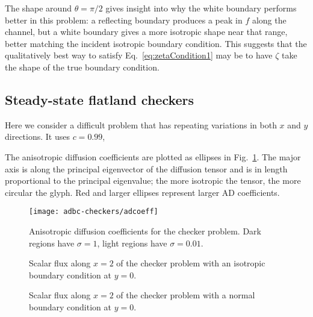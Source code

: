 The shape around $\theta=\pi/2$ gives insight into why the white boundary
performs better in this problem: a reflecting boundary produces a peak in $f$
along the channel, but a white boundary gives a more isotropic shape near that
range, better matching the incident isotropic boundary condition. This suggests
that the qualitatively best way to satisfy Eq.~\eqref{eq:zetaCondition1} may be
to have $\zeta$ take the shape of the true boundary condition.

\clearpage
\subsection{Steady-state flatland checkers}

Here we consider a difficult problem that has repeating variations in both $x$
and $y$ directions. It uses $c=0.99$, 

The anisotropic diffusion coefficients are plotted as ellipses in
Fig.~\ref{fig:bcCheckersAdcoeff}. The major axis is along the principal
eigenvector of the diffusion tensor and is in length proportional to the
principal eigenvalue; the more isotropic the tensor, the more circular the
glyph. Red and larger ellipses represent larger AD coefficients.

\begin{figure}[htb]
  \centering\small
  \texttt{[image: adbc-checkers/adcoeff]}
  \caption[Anisotropic diffusion coefficients for the checker problem.]{
  Anisotropic diffusion coefficients for the checker problem. Dark
  regions have $\sigma=1$, light regions have $\sigma=0.01$.}
  \label{fig:bcCheckersAdcoeff}
\end{figure}

\begin{figure}[htb]
  \centering\small
  \hspace{-.5in}
  
  \hspace{-.5in}
  \caption{Scalar flux along $x=2$ of the checker problem with an isotropic
  boundary condition at $y=0$.}
  \label{fig:bcCheckersIsotropic}
\end{figure}

\begin{figure}[htb]
  \centering\small
  \hspace{-.5in}
  
  \hspace{-.5in}
  \caption{Scalar flux along $x=2$ of the checker problem with a normal
  boundary condition at $y=0$.}
  \label{fig:bcCheckersDelta}
\end{figure}

